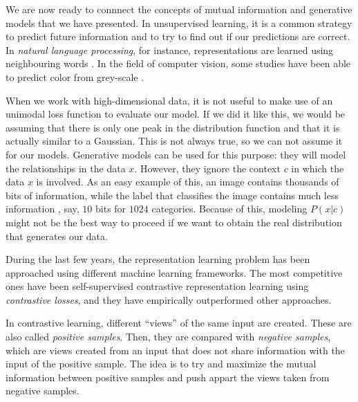 

We are now ready to connnect the concepts of mutual information and generative models that we have presented. In unsupervised learning,
it is a common strategy to predict future information and to try to find out if our predictions are correct.
In \emph{natural language processing}, for instance, representations are learned 
using neighbouring words \citep{mikolov_efficient_2013}. In the field of computer vision, some studies have been able to predict color from grey-scale \citep{doersch_unsupervised_2016}.

When we work with high-dimensional data, it is not useful to make use of an unimodal loss function to evaluate our model. If we did it like this, we would be assuming that there is only
one peak in the distribution function and that it is actually similar to a Gaussian.  This is not always true, so we can not assume it for our models. Generative models can be used for this purpose:
they will model the relationships in the data $x$. However, they ignore the context $c$ in which the data $x$ is involved. As an easy example of this, an image contains thousands of bits of information,
while the label that classifies the image contains much less information , say, $10$ bits for $1024$ categories. Because of this, modeling $P(x|c)$ might not be the best way to proceed if we want
to obtain the real distribution that generates our data. 

During the last few years, the representation learning problem has been approached using different machine learning frameworks. The most competitive ones have been self-supervised contrastive representation learning \cite{oord_representation_2019,tian_what_2020,hjelm_learning_2019,gutmann_noise-contrastive_nodate,chen_simple_2020,he_momentum_2020} using \emph{contrastive losses}, and they have empirically outperformed other approaches.     

In contrastive learning, different ``views'' of the same input are created. These are also called \emph{positive samples}. Then, they are compared with \emph{negative samples}, which are views created from an input that does not share information with the input of the positive sample. The idea is to try and maximize the mutual information between positive samples and push appart the views taken from negative samples. 

